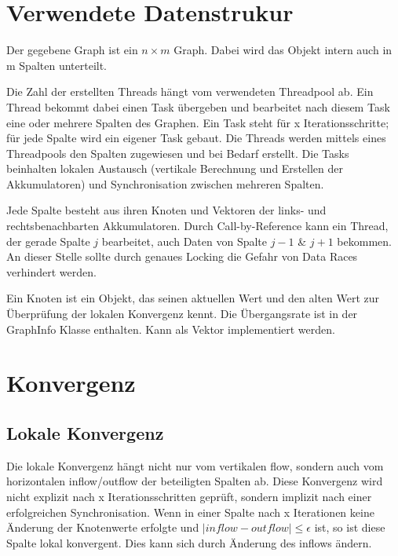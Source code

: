 \section{Verwendete Datenstrukur}
\label{datastructure}
Der gegebene Graph ist ein $n\times m$ Graph. Dabei wird das Objekt intern auch in m Spalten unterteilt. 

Die Zahl der erstellten Threads hängt vom verwendeten Threadpool ab. Ein Thread bekommt dabei einen Task übergeben und bearbeitet nach diesem Task eine oder mehrere Spalten des Graphen. Ein Task steht für x Iterationsschritte; für jede Spalte wird ein eigener Task gebaut. Die Threads werden mittels eines Threadpools den Spalten zugewiesen und bei Bedarf erstellt. Die Tasks beinhalten lokalen Austausch (vertikale Berechnung und Erstellen der Akkumulatoren) und Synchronisation zwischen mehreren Spalten.

Jede Spalte besteht aus ihren Knoten und Vektoren der links- und rechtsbenachbarten Akkumulatoren. Durch Call-by-Reference kann ein Thread, der gerade Spalte $j$ bearbeitet, auch Daten von Spalte $j-1$ \& $j+1$ bekommen. An dieser Stelle sollte durch genaues Locking die Gefahr von Data Races verhindert werden. 

Ein Knoten ist ein Objekt, das seinen aktuellen Wert und den alten Wert zur Überprüfung der lokalen Konvergenz kennt. Die Übergangsrate ist in der GraphInfo Klasse enthalten. Kann als Vektor implementiert werden.

\section{Konvergenz}
\subsection{Lokale Konvergenz}
\label{lk}
Die lokale Konvergenz hängt nicht nur vom vertikalen flow, sondern auch vom horizontalen inflow/outflow der beteiligten Spalten ab. Diese Konvergenz wird nicht explizit nach x Iterationsschritten geprüft, sondern implizit nach einer erfolgreichen Synchronisation. Wenn in einer Spalte nach x Iterationen keine Änderung der Knotenwerte erfolgte und  $ |inflow - outflow | \leq \epsilon$ ist, so ist diese Spalte lokal konvergent.  Dies kann sich durch Änderung des inflows ändern. 

